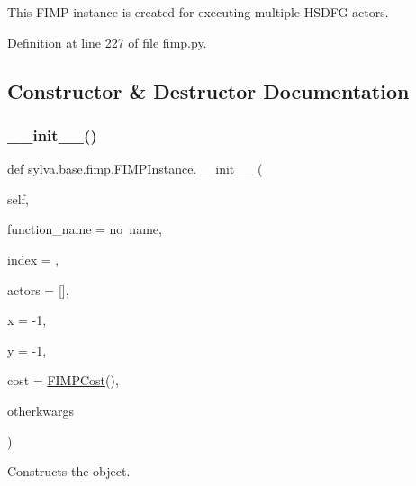 This F\+I\+MP instance is created for executing multiple H\+S\+D\+FG actors. 

Definition at line 227 of file fimp.\+py.



\subsection{Constructor \& Destructor Documentation}
\mbox{\label{classsylva_1_1base_1_1fimp_1_1_f_i_m_p_instance_ad4c68c73febfe4607ff8b0cf583628e0}} 
\subsubsection{\texorpdfstring{\+\_\+\+\_\+init\+\_\+\+\_\+()}{\_\_init\_\_()}}
{\footnotesize\ttfamily def sylva.\+base.\+fimp.\+F\+I\+M\+P\+Instance.\+\_\+\+\_\+init\+\_\+\+\_\+ (\begin{DoxyParamCaption}\item[{}]{self,  }\item[{}]{function\+\_\+name = {\ttfamily \textquotesingle{}no~name\textquotesingle{}},  }\item[{}]{index = {},  }\item[{}]{actors = {\ttfamily \mbox{[}\mbox{]}},  }\item[{}]{x = {\ttfamily -\/1},  }\item[{}]{y = {\ttfamily -\/1},  }\item[{}]{cost = {\ttfamily \hyperlink{classsylva_1_1base_1_1fimp_1_1_f_i_m_p_cost}{F\+I\+M\+P\+Cost}()},  }\item[{}]{otherkwargs }\end{DoxyParamCaption})}



Constructs the object. 


